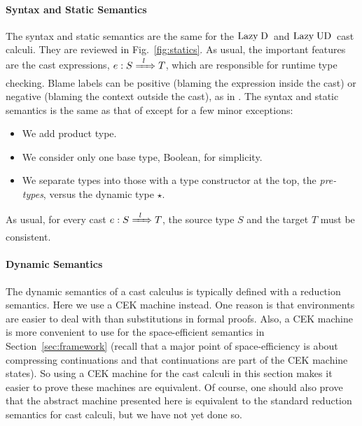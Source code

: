 \documentclass[runningheads]{llncs}
\newcommand{\figref}[1]{Fig.~\ref{#1}}
\newcommand{\chapref}[1]{Section~\ref{#1}}
\newcommand{\LUD}{\ensuremath{\text{Lazy\;UD}}}
\newcommand{\LD}{\ensuremath{\text{Lazy\;D}}}
\newcommand{\Tdyn}[0]{\ensuremath{\star}}
\newcommand{\ecast}[2]{\ensuremath{#1 : #2}}
\newcommand{\ccast}[3]{#1 \xRightarrow[]{\enskip #2 \enskip} #3}
\begin{document}
\paragraph{Syntax and Static Semantics}

The syntax and static semantics are the same for the \LD\ and
\LUD\ cast calculi. They are reviewed in \figref{fig:statics}.
As usual, the important features are the cast expressions,
$\ecast{e}{\ccast{S}{l}{T}}$, which are responsible for runtime type
checking. Blame labels can be positive (blaming the expression inside the cast)
or negative (blaming the context outside the cast), as in \cite{Wadler:2009qv,Siek:2015ab}.
The syntax and static semantics is the same as that of 
\citep{siek2009exploring} except for a few minor exceptions:

\begin{itemize}
\item We add product type.
\item We consider only one base type, Boolean, for simplicity.
\item We separate types into those with a type constructor at the top,
  the \emph{pre-types}, versus the dynamic type \Tdyn.
\end{itemize}
As usual, for every cast $\ecast{e}{\ccast{S}{l}{T}}$, the source type $S$ and 
the target $T$ must be consistent.

\paragraph{Dynamic Semantics}

The dynamic semantics of a cast calculus is typically defined with a
reduction semantics. Here we use a CEK machine
\citep{felleisen1986control} instead. One reason is that environments are 
easier 
to deal with than substitutions in formal proofs. Also, a CEK machine is more
convenient to use for the space-efficient semantics in
\chapref{sec:framework} (recall that a major point of space-efficiency 
is about compressing continuations and that continuations are part of the CEK 
machine states). So using a CEK machine for the cast 
calculi in this section makes it easier to prove these machines are equivalent.
Of course, one should also prove that the abstract machine
presented here is equivalent to the standard reduction semantics for
cast calculi, but we have not yet done so.
\end{document}

